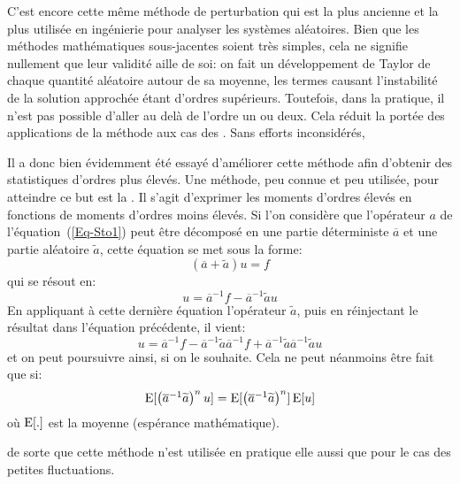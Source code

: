 \begin{histoire}
\medskip
C'est encore cette même méthode de perturbation qui est la plus ancienne et la plus utilisée en ingénierie pour analyser les systèmes aléatoires.
Bien que les méthodes mathématiques sous-jacentes soient très simples, cela ne signifie nullement que leur validité aille de soi: on fait un développement de Taylor de chaque quantité aléatoire autour de sa moyenne, les termes causant l'instabilité de la solution approchée étant d'ordres supérieurs. Toutefois, dans la pratique, il n'est pas possible d'aller au delà de l'ordre un ou deux. Cela réduit la portée des applications de la méthode aux cas des . Sans efforts inconsidérés, 

\medskip
Il a donc bien évidemment été essayé d'améliorer cette méthode afin d'obtenir des statistiques d'ordres plus élevés. Une méthode, peu connue et peu utilisée, pour atteindre ce but est la . Il s'agit d'exprimer les moments d'ordres élevés en fonctions de moments d'ordres moins élevés.
Si l'on considère que l'opérateur $a$ de l'équation~(\ref{Eq-Sto1}) peut être décomposé en une partie déterministe $\overline{a}$ et une partie aléatoire $\widetilde{a}$, cette équation se met sous la forme:
\begin{equation}
(\overline{a}+\widetilde{a})u=f
\end{equation}
qui se résout en:
\begin{equation}
u=\overline{a}^{-1}f-\overline{a}^{-1}\widetilde{a}u
\end{equation}
En appliquant à cette dernière équation l'opérateur $\widetilde{a}$, puis en réinjectant le résultat dans l'équation précédente, il vient:
\begin{equation}
u=\overline{a}^{-1}f-\overline{a}^{-1}\widetilde{a}\overline{a}^{-1}f+\overline{a}^{-1}\widetilde{a}\overline{a}^{-1}\widetilde{a}u
\end{equation}
et on peut poursuivre ainsi, si on le souhaite. Cela ne peut néanmoins être fait que si:
\begin{equation}\label{Eq-Unco}
\operatorname{E}[\begin{pmatrix}\overline{a}^{-1}\widetilde{a}\end{pmatrix}^nu] = \operatorname{E}[\begin{pmatrix}\overline{a}^{-1}\widetilde{a}\end{pmatrix}^n]\operatorname{E}[u]
\end{equation}
où $\operatorname{E}[.]$ est la moyenne (espérance mathématique). 

  de sorte que cette méthode n'est utilisée en pratique elle aussi que pour le cas des petites fluctuations.
\end{histoire}


